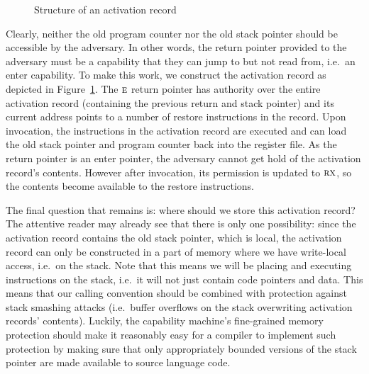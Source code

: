 \documentclass[format=acmsmall, review=true, screen=true]{acmart}
\renewcommand{\figurename}{Figure}
\newcommand{\plainperm}[1]{\textsc{#1}}
\newcommand{\exec}{\plainperm{rx}}
\newcommand{\entry}{\plainperm{e}}
\begin{document}
\begin{figure}[b]
  
  \caption{Structure of an activation record}
  \label{fig:activ-rec-struct}
\end{figure}

Clearly, neither the old program counter nor the old stack pointer should be accessible by the adversary. In
other words, the return pointer provided to the adversary must be a capability
that they can jump to but not read from, i.e.\ an enter capability. To make this
work, we construct the activation record as depicted in
\figurename~\ref{fig:activ-rec-struct}. The $\entry$ return pointer has authority
over the entire activation record (containing the previous return and stack
pointer) and its current address points to a number of restore instructions in
the record. Upon invocation, the instructions in the activation record are executed and can
load the old stack pointer and program counter back into the register file. As
the return pointer is an enter pointer, the adversary cannot get hold of the
activation record's contents. However after invocation, its permission is updated to
$\exec$, so the contents become available to the restore instructions.

The final question that remains is: where should we store this activation
record? The attentive reader may already see that there is only one possibility:
since the activation record contains the old stack pointer, which is local, the
activation record can only be constructed in a part of memory where we have
write-local access, i.e.\ on the stack. Note that this means we will be placing
and executing instructions on the stack, i.e.\ it will not just contain code
pointers and data. This means that our calling convention should be combined
with protection against stack smashing attacks (i.e.\ buffer overflows on the
stack overwriting activation records' contents). Luckily, the capability
machine's fine-grained memory protection should make it reasonably easy for a
compiler to implement such protection by making sure that only appropriately
bounded versions of the stack pointer are made available to source language
code.
\end{document}
